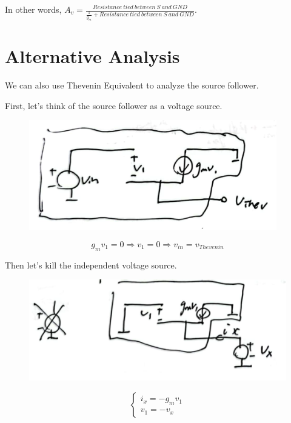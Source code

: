 \documentclass[fontset=windows]{article}
\begin{document}
In other words, $A_v=\frac{Resistance\ tied\ between\ S\ and\ GND}{\frac{1}{g_m}+Resistance\ tied\ between\ S\ and\ GND}$. 

\section*{Alternative Analysis}

We can also use Thevenin Equivalent to analyze the source follower. 

First, let's think of the source follower as a voltage source. 

\begin{figure}[htbp]
    \centering
    \includegraphics[scale=0.8]{3.jpg}
    \captionsetup{labelformat=empty}
    \caption{}
    \label{3}
\end{figure}

$$g_mv_1=0\Longrightarrow v_1=0\Longrightarrow v_{in}=v_{Thevenin}$$

Then let's kill the independent voltage source. 

\begin{figure}[htbp]
    \centering
    \includegraphics[scale=0.8]{4.jpg}
    \captionsetup{labelformat=empty}
    \caption{}
    \label{4}
\end{figure}

\begin{equation*}
    \begin{cases}
        i_x=-g_mv_1 \\
        v_1=-v_x
    \end{cases}
\end{equation*}
\end{document}
